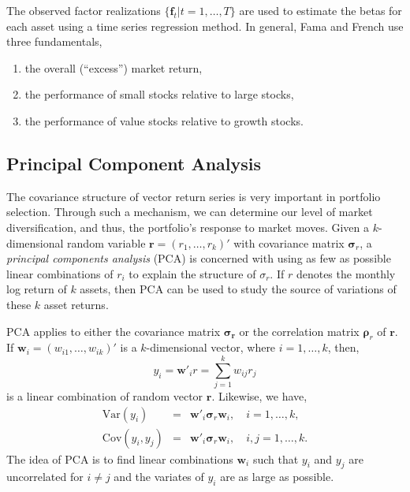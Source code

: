 The observed factor realizations $\{\mathbf{f}_t|t=1,\ldots,T\}$ are used to estimate the betas for each asset using a time series regression method. In general, Fama and French use three fundamentals,
\begin{enumerate}
\item the overall (``excess'') market return,
\item the performance of small stocks relative to large stocks,
\item the performance of value stocks relative to growth stocks.
\end{enumerate}

\subsection{Principal Component Analysis}
The covariance structure of vector return series is very important in portfolio selection. Through such a mechanism, we can determine our level of market diversification, and thus, the portfolio's response to market moves. Given a $k$-dimensional random variable $\mathbf{r}=(r_1,\ldots,r_k)'$ with covariance matrix $\mathbf{\sigma}_r$, a \emph{principal components analysis} (PCA) is concerned with using as few as possible linear combinations of $r_i$ to explain the structure of $\sigma_r$. If $r$ denotes the monthly log return of $k$ assets, then PCA can be used to study the source of variations of these $k$ asset returns.

PCA applies to either the covariance matrix $\mathbf{\sigma_r}$ or the correlation matrix $\mathbf{\rho}_r$ of $\mathbf{r}$. If $\mathbf{w}_i=(w_{i1},\ldots,w_{ik})'$ is a $k$-dimensional vector, where $i=1,\ldots,k$, then,
\[
y_i=\mathbf{w}'_i r = \sum^k_{j=1}w_{ij}r_j
\]
is a linear combination of random vector $\mathbf{r}$. Likewise, we have,
\begin{subequations}
\begin{eqnarray}
\text{Var}(y_i)&=&\mathbf{w}'_i \mathbf{\sigma}_r \mathbf{w}_i, \quad i=1,\ldots,k, \\
\text{Cov}(y_i,y_j)&=&\mathbf{w}'_i \mathbf{\sigma}_r \mathbf{w}_i, \quad i,j=1,\ldots,k.
\end{eqnarray}
\end{subequations}
The idea of PCA is to find linear combinations $\mathbf{w}_i$ such that $y_i$ and $y_j$ are uncorrelated for $i \ne j$ and the variates of $y_i$ are as large as possible.

